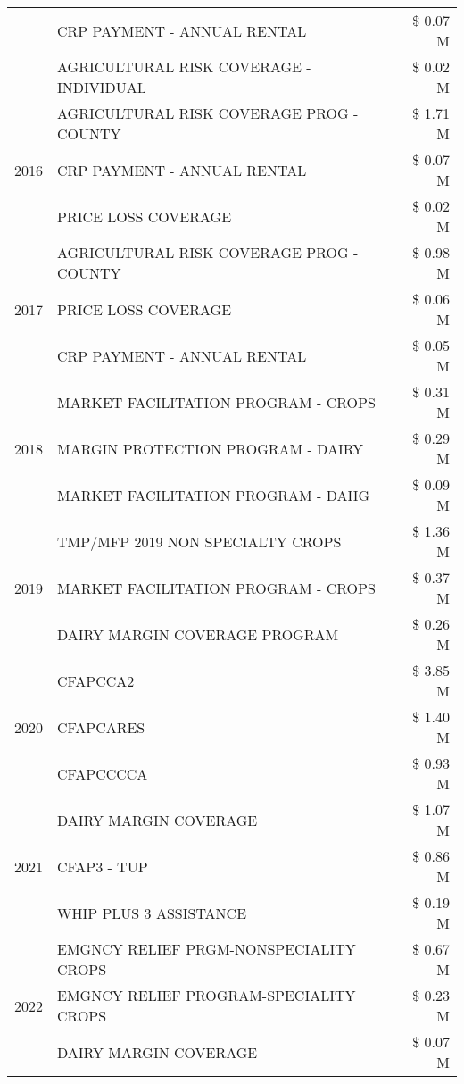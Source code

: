 \begin{tabular}{llr}
 & CRP PAYMENT - ANNUAL RENTAL & \$ 0.07 M \\
 & AGRICULTURAL RISK COVERAGE - INDIVIDUAL & \$ 0.02 M \\
\cline{1-3}
\multirow[t]{3}{*}{2016} & AGRICULTURAL RISK COVERAGE PROG - COUNTY & \$ 1.71 M \\
 & CRP PAYMENT - ANNUAL RENTAL & \$ 0.07 M \\
 & PRICE LOSS COVERAGE & \$ 0.02 M \\
\cline{1-3}
\multirow[t]{3}{*}{2017} & AGRICULTURAL RISK COVERAGE PROG - COUNTY & \$ 0.98 M \\
 & PRICE LOSS COVERAGE & \$ 0.06 M \\
 & CRP PAYMENT - ANNUAL RENTAL & \$ 0.05 M \\
\cline{1-3}
\multirow[t]{3}{*}{2018} & MARKET FACILITATION PROGRAM - CROPS & \$ 0.31 M \\
 & MARGIN PROTECTION PROGRAM - DAIRY & \$ 0.29 M \\
 & MARKET FACILITATION PROGRAM - DAHG & \$ 0.09 M \\
\cline{1-3}
\multirow[t]{3}{*}{2019} & TMP/MFP 2019 NON SPECIALTY CROPS & \$ 1.36 M \\
 & MARKET FACILITATION PROGRAM - CROPS & \$ 0.37 M \\
 & DAIRY MARGIN COVERAGE PROGRAM & \$ 0.26 M \\
\cline{1-3}
\multirow[t]{3}{*}{2020} & CFAPCCA2 & \$ 3.85 M \\
 & CFAPCARES & \$ 1.40 M \\
 & CFAPCCCCA & \$ 0.93 M \\
\cline{1-3}
\multirow[t]{3}{*}{2021} & DAIRY MARGIN COVERAGE & \$ 1.07 M \\
 & CFAP3 - TUP & \$ 0.86 M \\
 & WHIP PLUS 3 ASSISTANCE & \$ 0.19 M \\
\cline{1-3}
\multirow[t]{3}{*}{2022} & EMGNCY RELIEF PRGM-NONSPECIALITY CROPS & \$ 0.67 M \\
 & EMGNCY RELIEF PROGRAM-SPECIALITY CROPS & \$ 0.23 M \\
 & DAIRY MARGIN COVERAGE & \$ 0.07 M \\
\cline{1-3}
\bottomrule
\end{tabular}
